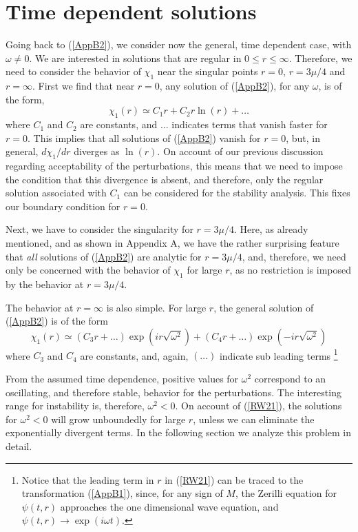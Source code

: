 \documentclass[12pt,aps,floats,showpacs,amssymb,tightenlines]{revtex4}
\begin{document}
\section{Time dependent solutions}

Going back to (\ref{AppB2}), we consider now the general, time dependent case, with
 $\omega \neq 0$. We are interested in solutions that are regular in $0\leq r \leq \infty$.
 Therefore, we need to consider the behavior of $\chi_1$ near the singular points
  $r=0$, $r=3\mu/4$ and $r=\infty$. First we find that near $r=0$,
  any solution of (\ref{AppB2}), for any $\omega$, is of the form,
\begin{equation}
\label{RW20}
\chi_1(r) \simeq C_1 r + C_2 r \ln(r) + \dots
\end{equation}
where $C_1$ and $C_2$ are constants, and $\dots$ indicates terms that vanish faster
for $r=0$. This implies that all solutions of (\ref{AppB2}) vanish for $r=0$, but,
in general, $d \chi_1/dr$ diverges as $\ln(r)$. On account of our previous discussion
regarding acceptability of the perturbations, this means that we need to impose the condition
that this divergence is absent, and therefore, only the regular solution associated with $C_1$
can be considered for the stability analysis. This fixes our boundary condition for $r=0$.

Next, we have to consider the singularity for $r=3\mu/4$. Here, as already mentioned,
and as shown in Appendix A, we have the rather surprising feature that {\em all}
 solutions of (\ref{AppB2}) are analytic for $r=3\mu/4$, and, therefore, we need only
 be concerned with the behavior of $\chi_1$ for large $r$, as no restriction is imposed
 by the behavior at $r=3\mu/4$.

The behavior at $r=\infty$ is also simple. For large $r$, the general solution of (\ref{AppB2})
 is of the form
\begin{equation}
\label{RW21}
 \chi_1(r) \simeq   \left( {C_3} r +\dots
 \right) \exp(i r\sqrt{\omega^2})+  \left( C_4 r +\dots\right)
\exp(-i r\sqrt {\omega^2})
\end{equation}
where $C_3$ and $C_4$ are constants, and, again, $(\dots)$ indicate
sub leading terms \footnote{ Notice that the leading term in $r$ in
(\ref{RW21}) can be traced to the
 transformation (\ref{AppB1}), since, for any sign of $M$, the Zerilli equation for $\psi(t,r)$
 approaches the one dimensional wave equation, and $\psi(t,r) \rightarrow \exp(i \omega t)$.}

From the assumed time dependence,
positive values for $\omega^2$ correspond to an oscillating, and
therefore stable, behavior for the perturbations. The interesting
range for instability is, therefore, $\omega^2 < 0$.
 On account of (\ref{RW21}), the solutions for $\omega^2 < 0$ will
grow unboundedly for large $r$, unless we can eliminate the exponentially divergent terms.
  In the following section we analyze this problem in detail.
\end{document}
